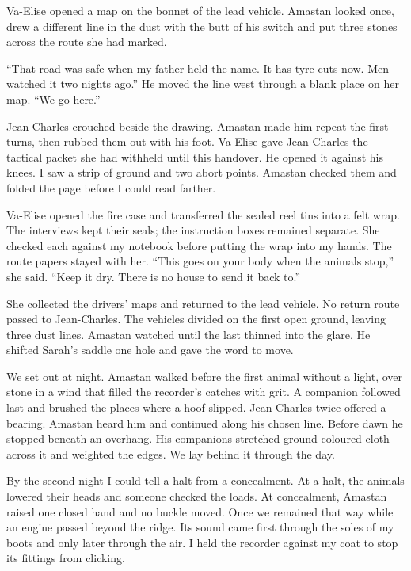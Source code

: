 Va-Elise opened a map on the bonnet of the lead vehicle. Amastan looked once, drew a different line in the dust with the butt of his switch and put three stones across the route she had marked.\par

``That road was safe when my father held the name. It has tyre cuts now. Men watched it two nights ago.'' He moved the line west through a blank place on her map. ``We go here.''\par

Jean-Charles crouched beside the drawing. Amastan made him repeat the first turns, then rubbed them out with his foot. Va-Elise gave Jean-Charles the tactical packet she had withheld until this handover. He opened it against his knees. I saw a strip of ground and two abort points. Amastan checked them and folded the page before I could read farther.\par

Va-Elise opened the fire case and transferred the sealed reel tins into a felt wrap. The interviews kept their seals; the instruction boxes remained separate. She checked each against my notebook before putting the wrap into my hands. The route papers stayed with her. ``This goes on your body when the animals stop,'' she said. ``Keep it dry. There is no house to send it back to.''\par

She collected the drivers' maps and returned to the lead vehicle. No return route passed to Jean-Charles. The vehicles divided on the first open ground, leaving three dust lines. Amastan watched until the last thinned into the glare. He shifted Sarah's saddle one hole and gave the word to move.\par

We set out at night. Amastan walked before the first animal without a light, over stone in a wind that filled the recorder's catches with grit. A companion followed last and brushed the places where a hoof slipped. Jean-Charles twice offered a bearing. Amastan heard him and continued along his chosen line. Before dawn he stopped beneath an overhang. His companions stretched ground-coloured cloth across it and weighted the edges. We lay behind it through the day.\par

By the second night I could tell a halt from a concealment. At a halt, the animals lowered their heads and someone checked the loads. At concealment, Amastan raised one closed hand and no buckle moved. Once we remained that way while an engine passed beyond the ridge. Its sound came first through the soles of my boots and only later through the air. I held the recorder against my coat to stop its fittings from clicking.\par

